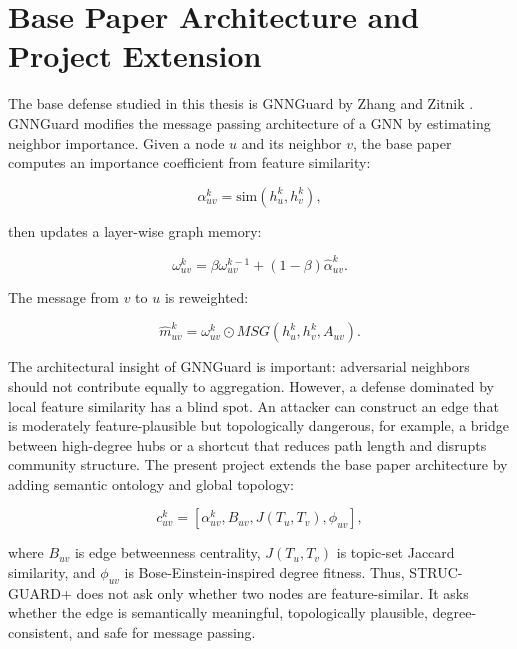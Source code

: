 \documentclass[12pt,oneside]{report}
\begin{document}
\section{Base Paper Architecture and Project Extension}
The base defense studied in this thesis is GNNGuard by Zhang and Zitnik \cite{zhang2020gnnguard}. GNNGuard modifies the message passing architecture of a GNN by estimating neighbor importance. Given a node $u$ and its neighbor $v$, the base paper computes an importance coefficient from feature similarity:

$$
\alpha_{uv}^{k}=\text{sim}(h_u^k,h_v^k),
$$

then updates a layer-wise graph memory:

$$
\omega_{uv}^{k}=\beta\omega_{uv}^{k-1}+(1-\beta)\hat{\alpha}_{uv}^{k}.
$$

The message from $v$ to $u$ is reweighted:

$$
\hat{m}_{uv}^{k}=\omega_{uv}^{k}\odot MSG(h_u^k,h_v^k,A_{uv}).
$$

The architectural insight of GNNGuard is important: adversarial neighbors should not contribute equally to aggregation. However, a defense dominated by local feature similarity has a blind spot. An attacker can construct an edge that is moderately feature-plausible but topologically dangerous, for example, a bridge between high-degree hubs or a shortcut that reduces path length and disrupts community structure. The present project extends the base paper architecture by adding semantic ontology and global topology:

$$
c_{uv}^{k}=[\alpha_{uv}^{k},B_{uv},J(T_u,T_v),\phi_{uv}],
$$

where $B_{uv}$ is edge betweenness centrality, $J(T_u,T_v)$ is topic-set Jaccard similarity, and $\phi_{uv}$ is Bose-Einstein-inspired degree fitness. Thus, STRUC-GUARD+ does not ask only whether two nodes are feature-similar. It asks whether the edge is semantically meaningful, topologically plausible, degree-consistent, and safe for message passing.
\end{document}
